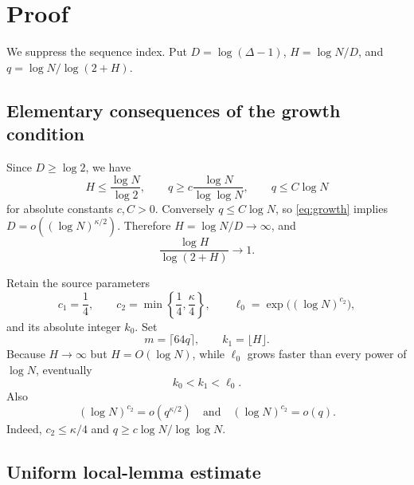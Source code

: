 \documentclass[11pt]{article}
\begin{document}
\section*{Proof}

We suppress the sequence index. Put $D=\log(\Delta-1)$,
$H=\log N/D$, and $q=\log N/\log(2+H)$.

\subsection*{Elementary consequences of the growth condition}

Since $D\geq\log2$, we have
\[
 H\leq \frac{\log N}{\log2},\qquad
 q\geq c\frac{\log N}{\log\log N},\qquad
 q\leq C\log N
\]
for absolute constants $c,C>0$. Conversely $q\leq C\log N$, so
\eqref{eq:growth} implies $D=o((\log N)^{\kappa/2})$. Therefore
$H=\log N/D\to\infty$, and
\begin{equation}\label{eq:logH}
 \frac{\log H}{\log(2+H)}\longrightarrow1.
\end{equation}

Retain the source parameters
\[
 c_1=\frac14,\qquad
 c_2=\min\left\{\frac14,\frac\kappa4\right\},\qquad
 \ell_0=\exp\big((\log N)^{c_2}\big),
\]
and its absolute integer $k_0$. Set
\[
 m=\lceil64q\rceil,\qquad k_1=\lfloor H\rfloor.
\]
Because $H\to\infty$ but $H=O(\log N)$, while $\ell_0$ grows faster than
every power of $\log N$, eventually
\begin{equation}\label{eq:order}
 k_0<k_1<\ell_0.
\end{equation}
Also
\begin{equation}\label{eq:smallterms}
 (\log N)^{c_2}=o(q^{\kappa/2})
 \quad\text{and}\quad
 (\log N)^{c_2}=o(q).
\end{equation}
Indeed, $c_2\leq\kappa/4$ and
$q\geq c\log N/\log\log N$.

\subsection*{Uniform local-lemma estimate}
\end{document}
